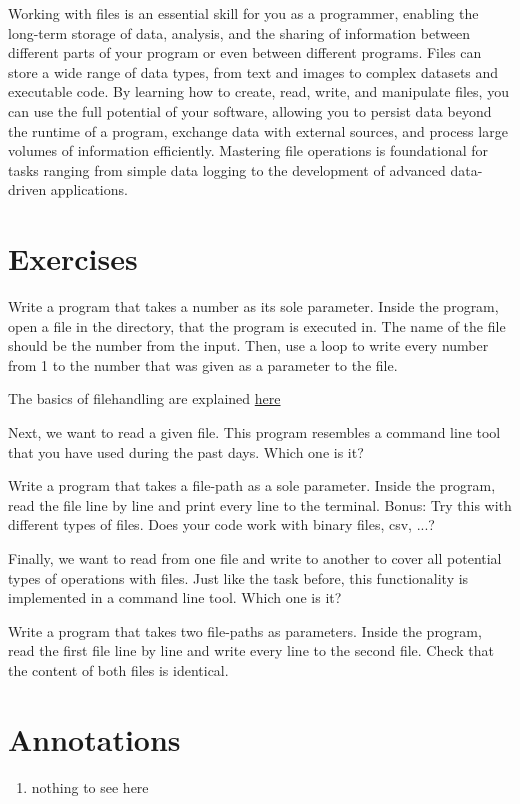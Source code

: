 \documentclass{dcbl/challenge}
\begin{document}
Working with files is an essential skill for you as a programmer, enabling the long-term storage of data, analysis, and the sharing of information between different parts of your program or even between different programs. Files can store a wide range of data types, from text and images to complex datasets and executable code. By learning how to create, read, write, and manipulate files, you can use the full potential of your software, allowing you to persist data beyond the runtime of a program, exchange data with external sources, and process large volumes of information efficiently. Mastering file operations is foundational for tasks ranging from simple data logging to the development of advanced data-driven applications.


\section*{Exercises}
\begin{aufgabe}
    Write a program that takes a number as its sole parameter.
    Inside the program, open a file in the directory, that the program is executed in. The name of the file should be the number from the input.
    Then, use a loop to write every number from 1 to the number that was given as a parameter to the file.

    The basics of filehandling are explained \href{https://www.geeksforgeeks.org/basics-file-handling-c/}{here}
\end{aufgabe}

\begin{aufgabe}
    Next, we want to read a given file. This program resembles a command line tool that you have used during the past days. Which one is it?
    
    Write a program that takes a file-path as a sole parameter.
    Inside the program, read the file line by line and print every line to the terminal.
    Bonus: Try this with different types of files. Does your code work with binary files, csv, ...?
\end{aufgabe}

\begin{aufgabe}
    Finally, we want to read from one file and write to another to cover all potential types of operations with files. Just like the task before, this functionality is implemented in a command line tool. Which one is it?
    
    Write a program that takes two file-paths as parameters.
    Inside the program, read the first file line by line and write every line to the second file. Check that the content of both files is identical.
\end{aufgabe}


\section*{Annotations}
\begin{enumerate}
    \item nothing to see here
\end{enumerate}
\end{document}
